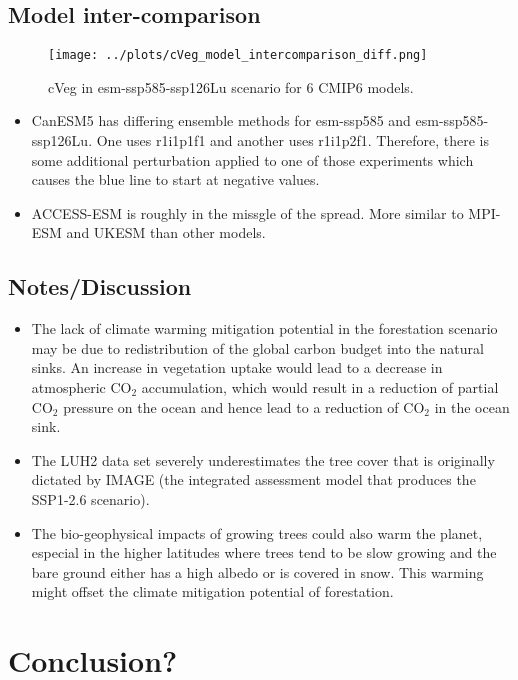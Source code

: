 \documentclass[]{article}
\begin{document}
\subsection{Model inter-comparison}

\begin{figure}[H]
    \centering
    \texttt{[image: ../plots/cVeg\_model\_intercomparison\_diff.png]}
    \caption{cVeg in esm-ssp585-ssp126Lu scenario for 6 CMIP6 models.}
    \label{fig:models}
\end{figure}

\begin{itemize}
    \item CanESM5 has differing ensemble methods for esm-ssp585 and esm-ssp585-ssp126Lu. One uses r1i1p1f1 and another uses r1i1p2f1. Therefore, there is some additional perturbation applied to one of those experiments which causes the blue line to start at negative values.
    \item ACCESS-ESM is roughly in the missgle of the spread. More similar to MPI-ESM and UKESM than other models.
\end{itemize}

\subsection{Notes/Discussion}

\begin{itemize}
    \item The lack of climate warming mitigation potential in the forestation scenario may be due to redistribution of the global carbon budget into the natural sinks.
        An increase in vegetation uptake would lead to a decrease in atmospheric CO$_2$ accumulation, which would result in a reduction of partial CO$_2$ pressure on the ocean and hence lead to a reduction of CO$_2$ in the ocean sink.
    \item The LUH2 data set severely underestimates the tree cover that is originally dictated by IMAGE (the integrated assessment model that produces the SSP1-2.6 scenario).
    \item The bio-geophysical impacts of growing trees could also warm the planet, especial in the higher latitudes where trees tend to be slow growing and the bare ground either has a high albedo or is covered in snow. This warming might offset the climate mitigation potential of forestation.
\end{itemize}

\section{Conclusion?}

\printbibliography
\end{document}

